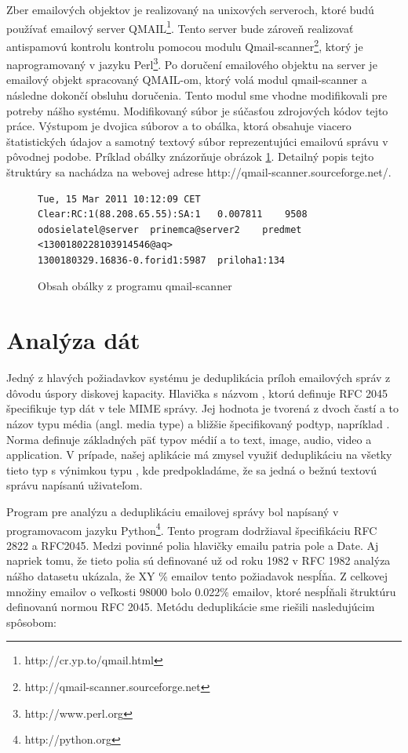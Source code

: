 \documentclass[11pt,twoside,a4paper]{book}
\begin{document}
Zber emailových objektov je realizovaný na unixových serveroch, ktoré budú používať emailový server QMAIL\footnote{http://cr.yp.to/qmail.html}. Tento server bude zároveň realizovať antispamovú kontrolu kontrolu pomocou modulu Qmail-scanner\footnote{http://qmail-scanner.sourceforge.net}, ktorý je naprogramovaný v jazyku Perl\footnote{http://www.perl.org}. Po doručení emailového objektu na server je emailový objekt spracovaný QMAIL-om, ktorý volá modul qmail-scanner a následne dokončí obsluhu doručenia. Tento modul sme vhodne modifikovali pre potreby nášho systému. Modifikovaný súbor je súčasťou zdrojových kódov tejto práce. Výstupom je dvojica súborov a to obálka, ktorá obsahuje viacero štatistických údajov a samotný textový súbor reprezentujúci emailovú správu v pôvodnej podobe. Príklad obálky znázorňuje obrázok \ref{fig:envelope}. Detailný popis tejto štruktúry sa nachádza na webovej adrese http://qmail-scanner.sourceforge.net/.

\begin{figure}[h]
\begin{verbatim}
Tue, 15 Mar 2011 10:12:09 CET	Clear:RC:1(88.208.65.55):SA:1	0.007811	9508	odosielatel@server	prinemca@server2	predmet	<1300180228103914546@aq>	
1300180329.16836-0.forid1:5987	priloha1:134
\end{verbatim}
 \caption{Obsah obálky z programu qmail-scanner}
 \label{fig:envelope}
\end{figure}


\section{Analýza dát}
Jedný z hlavých požiadavkov systému je deduplikácia príloh emailových správ z dôvodu úspory diskovej kapacity. Hlavička s názvom , ktorú definuje RFC 2045 špecifikuje typ dát v tele MIME správy. Jej hodnota je tvorená z dvoch častí a to názov typu média (angl. media type) a bližšie špecifikovaný podtyp, napríklad . Norma definuje základných päť typov médií a to text, image, audio, video a application. V prípade, našej aplikácie má zmysel využiť deduplikáciu na všetky tieto typ s výnimkou typu , kde predpokladáme, že sa jedná o bežnú textovú správu napísanú uživateľom.

Program pre analýzu a deduplikáciu emailovej správy bol napísaný v programovacom jazyku Python\footnote{http://python.org}. Tento program dodržiaval špecifikáciu RFC 2822 a RFC2045. 
Medzi povinné polia hlavičky emailu patria pole  a {Date}. Aj napriek tomu, že tieto polia sú definované už od roku 1982 v RFC 1982 analýza nášho datasetu ukázala, že XY \% emailov tento požiadavok nespĺňa. Z celkovej množiny emailov o veľkosti 98000 bolo 0.022\% emailov, ktoré nespĺňali štruktúru definovanú normou RFC 2045. Metódu deduplikácie sme riešili nasledujúcim spôsobom:
\end{document}
